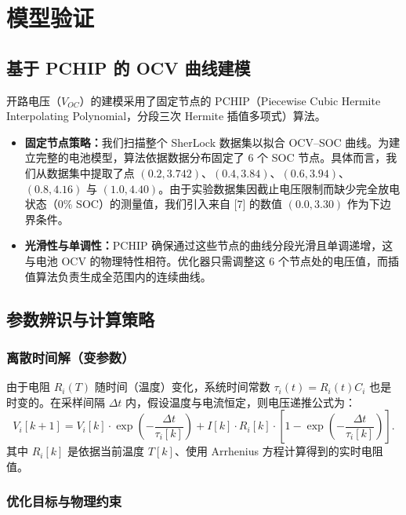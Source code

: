 \documentclass[11pt,a4paper]{ctexart}
\begin{document}
\section{模型验证}

\subsection{基于 PCHIP 的 OCV 曲线建模}

开路电压（$V_{OC}$）的建模采用了固定节点的 PCHIP（Piecewise Cubic Hermite Interpolating Polynomial，分段三次 Hermite 插值多项式）算法。

\begin{itemize}[leftmargin=1.6em,itemsep=0.3em]
\item \textbf{固定节点策略：}我们扫描整个 SherLock 数据集以拟合 OCV--SOC 曲线。为建立完整的电池模型，算法依据数据分布固定了 6 个 SOC 节点。具体而言，我们从数据集中提取了点 $(0.2,3.742)$、$(0.4,3.84)$、$(0.6,3.94)$、$(0.8,4.16)$ 与 $(1.0,4.40)$。由于实验数据集因截止电压限制而缺少完全放电状态（0\% SOC）的测量值，我们引入来自 [7] 的数值 $(0.0,3.30)$ 作为下边界条件。
\item \textbf{光滑性与单调性：}PCHIP 确保通过这些节点的曲线分段光滑且单调递增，这与电池 OCV 的物理特性相符。优化器只需调整这 6 个节点处的电压值，而插值算法负责生成全范围内的连续曲线。
\end{itemize}

\subsection{参数辨识与计算策略}

\subsubsection{离散时间解（变参数）}

由于电阻 $R_i(T)$ 随时间（温度）变化，系统时间常数 $\tau_i(t)=R_i(t)C_i$ 也是时变的。在采样间隔 $\Delta t$ 内，假设温度与电流恒定，则电压递推公式为：
\begin{equation}
V_i[k+1]=V_i[k]\cdot\exp\left(-\frac{\Delta t}{\tau_i[k]}\right)+I[k]\cdot R_i[k]\cdot\left[1-\exp\left(-\frac{\Delta t}{\tau_i[k]}\right)\right].
\end{equation}
其中 $R_i[k]$ 是依据当前温度 $T[k]$、使用 Arrhenius 方程计算得到的实时电阻值。

\subsubsection{优化目标与物理约束}
\end{document}
